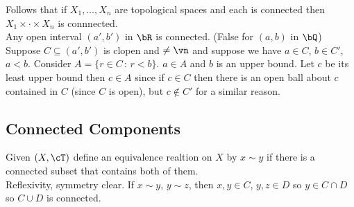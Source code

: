 \noindent
Follows that if $X_1, \ldots, X_n$ are topological spaces and each is connected then $X_1 \times \cdot \times X_n$ is connnected. \\

\noindent
Any open interval $(a',b')$ in $\bR$ is connected. (False for $(a,b)$ in $\bQ$) \\
Suppose $C \subseteq (a',b')$ is clopen and $\neq \vn$ and suppose we have $a \in C$, $b \in C'$, $a<b$. Consider $A = \{r \in C \, : \, r < b\}$. $a \in A$ and $b$ is an upper bound. Let $c$ be its least upper bound then $c \in A$ since if $c \in C$ then there is an open ball about $c$ contained in $C$ (since $C$ is open), but $c \not\in C'$ for a similar reason. 

\subsection{Connected Components} 

Given $(X, \cT)$ define an equivalence realtion on $X$ by $x \sim y$ if there is a connected subset that contains both of them. \\
Reflexivity, symmetry clear. If $x \sim y$, $y \sim z$, then $x,y \in C$, $y, z \in D$ so $y \in C \cap D$ so $C \cup D$ is connected. 
